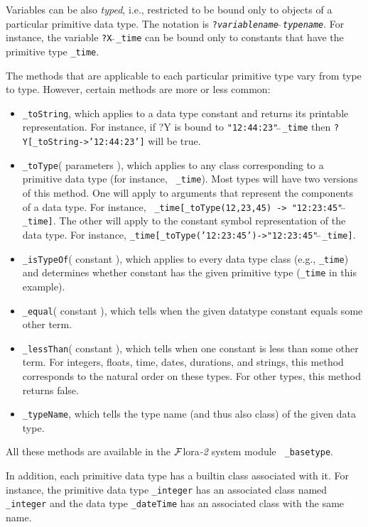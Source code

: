 \documentclass[11pt]{article}
\newcommand{\FLORA}{{\mbox{\sc ${\cal F}${lora}\rm\emph{-2}}}\xspace}
\begin{document}
Variables can be also \emph{typed}, i.e., restricted to be bound only to 
objects of a particular primitive data type. The notation is
{\tt ?\emph{variablename}$\hat{~}\hat{~}$\emph{typename}}. 
For instance, the variable {\tt ?X$\hat{~}\hat{~}$\_time}  
can be bound only to constants that have the primitive type {\tt \_time}. 

The methods that are applicable to each particular primitive type vary from
type to type. However, certain methods are more or less common:

 \begin{itemize}
    \item {\tt \_toString}, which applies to a data type constant and
      returns its printable representation. For instance, if ?Y is bound to
      {\tt "12:44:23"$\hat{~}\hat{~}$\_time} then {\tt ?Y[\_toString->'12:44:23']} will
      be true.
    \item {\tt \_toType}( parameters ), which applies to any class
      corresponding to a primitive data type (for instance, {\tt
        \_time}). Most types will have two versions of this method. One
      will apply to arguments that represent the components of a data
      type. For instance, {\tt
        \_time[\_toType(12,23,45) -> "12:23:45"$\hat{~}\hat{~}$\_time]}.  The other will
      apply to the constant symbol representation of the data type. For instance,
      {\tt \_time[\_toType('12:23:45')->"12:23:45"$\hat{~}\hat{~}$\_time]}. 
    \item {\tt \_isTypeOf}( constant ), which applies to every data type
      class (e.g., {\tt \_time}) and determines whether constant has the
      given primitive type ({\tt \_time} in this example).
    \item {\tt \_equal}( constant ), which tells when the given datatype constant equals some other term.
    \item {\tt \_lessThan}( constant ), which tells when one constant is
      less than some other term. For integers, floats, time, dates,
      durations, and strings, this method corresponds to the natural order
      on these types. For other types, this method returns false.
    \item {\tt \_typeName}, which tells the type name (and thus also class)
      of the given data type.
    \end{itemize}

    All these methods are available in the \FLORA system module {\tt
      \_basetype}. 

In addition, each primitive data type has a builtin class associated with it.
For instance, the primitive data type {\tt \_integer} has an associated
class  named {\tt \_integer} and the data type {\tt \_dateTime} has an
associated class with the same name.  
\end{document}
